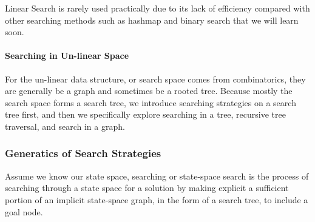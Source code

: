 \documentclass[../main.tex]{subfiles}
\begin{document}
Linear Search is rarely used practically due to its lack of efficiency compared with other searching methods such as hashmap and binary search that we will learn soon.
\paragraph{Searching in Un-linear Space}
For the un-linear data structure, or search space comes from combinatorics, they are generally be a graph and sometimes be a rooted tree. Because mostly the search space forms a search tree, we introduce searching strategies on a search tree first, and then we specifically explore searching in a tree, recursive tree traversal, and search in a graph. 

\subsubsection{Generatics of Search Strategies}
Assume we know our state space, searching or state-space search is the process of searching through a state space for a solution by making explicit a sufficient portion of an implicit state-space graph, in the form of a search tree, to include a goal node. 
\end{document}
